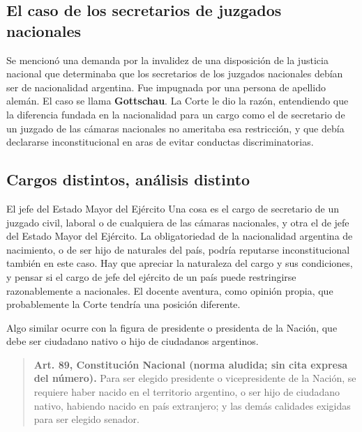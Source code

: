 \documentclass[12pt,oneside]{book}
\begin{document}
\subsection{El caso de los secretarios de juzgados nacionales}

Se mencionó una demanda por la invalidez de una disposición de la justicia nacional que determinaba que los secretarios de los juzgados nacionales debían ser de nacionalidad argentina. Fue impugnada por una persona de apellido alemán. El caso se llama \textbf{Gottschau}. La Corte le dio la razón, entendiendo que la diferencia fundada en la nacionalidad para un cargo como el de secretario de un juzgado de las cámaras nacionales no ameritaba esa restricción, y que debía declararse inconstitucional en aras de evitar conductas discriminatorias.


\subsection{Cargos distintos, análisis distinto}

\begin{example}{El jefe del Estado Mayor del Ejército}
Una cosa es el cargo de secretario de un juzgado civil, laboral o de cualquiera de las cámaras nacionales, y otra el de jefe del Estado Mayor del Ejército. La obligatoriedad de la nacionalidad argentina de nacimiento, o de ser hijo de naturales del país, podría reputarse inconstitucional también en este caso. Hay que apreciar la naturaleza del cargo y sus condiciones, y pensar si el cargo de jefe del ejército de un país puede restringirse razonablemente a nacionales. El docente aventura, como opinión propia, que probablemente la Corte tendría una posición diferente.
\end{example}

Algo similar ocurre con la figura de presidente o presidenta de la Nación, que debe ser ciudadano nativo o hijo de ciudadanos argentinos.

\begin{quote}
\textbf{Art. 89, Constitución Nacional (norma aludida; sin cita expresa del número).} Para ser elegido presidente o vicepresidente de la Nación, se requiere haber nacido en el territorio argentino, o ser hijo de ciudadano nativo, habiendo nacido en país extranjero; y las demás calidades exigidas para ser elegido senador.
\end{quote}
\end{document}
